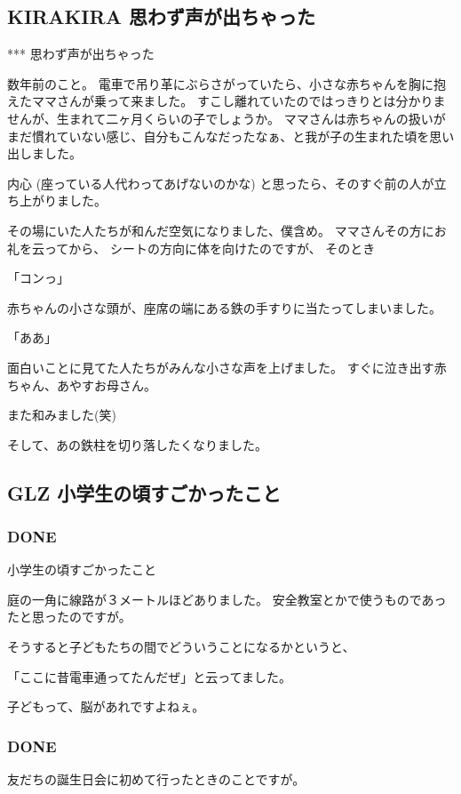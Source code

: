 \documentclass[11pt]{article}
\begin{document}
\subsection{KIRAKIRA 思わず声が出ちゃった}
\label{sec-64_1}

***
思わず声が出ちゃった

数年前のこと。
電車で吊り革にぶらさがっていたら、小さな赤ちゃんを胸に抱えたママさんが乗って来ました。
すこし離れていたのではっきりとは分かりませんが、生まれて二ヶ月くらいの子でしょうか。
ママさんは赤ちゃんの扱いがまだ慣れていない感じ、自分もこんなだったなぁ、と我が子の生まれた頃を思い出しました。

内心 (座っている人代わってあげないのかな) と思ったら、そのすぐ前の人が立ち上がりました。

その場にいた人たちが和んだ空気になりました、僕含め。
ママさんその方にお礼を云ってから、 シートの方向に体を向けたのですが、
そのとき

 「コンっ」

赤ちゃんの小さな頭が、座席の端にある鉄の手すりに当たってしまいました。

「ああ」

面白いことに見てた人たちがみんな小さな声を上げました。
すぐに泣き出す赤ちゃん、あやすお母さん。

また和みました(笑)

そして、あの鉄柱を切り落したくなりました。
\subsection{GLZ 小学生の頃すごかったこと}
\label{sec-64_2}
\subsubsection{\textbf{DONE}}
\label{sec-64_2_1}

小学生の頃すごかったこと

庭の一角に線路が３メートルほどありました。
安全教室とかで使うものであったと思ったのですが。

そうすると子どもたちの間でどういうことになるかというと、

「ここに昔電車通ってたんだぜ」と云ってました。

子どもって、脳があれですよねぇ。
\subsubsection{\textbf{DONE}}
\label{sec-64_2_2}

友だちの誕生日会に初めて行ったときのことですが。
\end{document}
